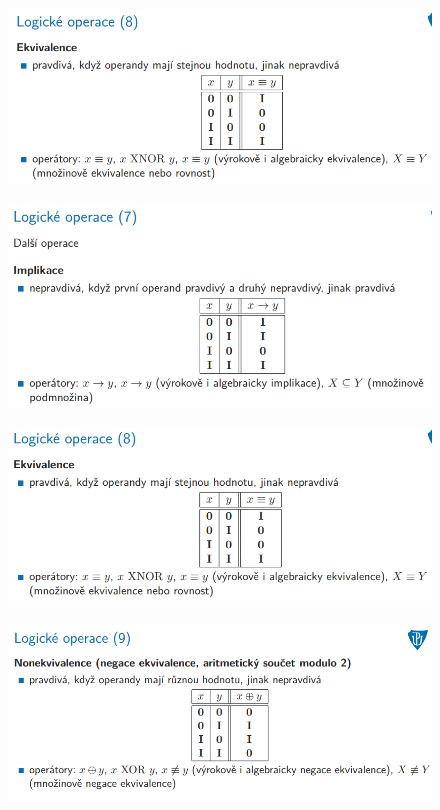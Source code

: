 \documentclass[10pt,a4paper]{article}
\begin{document}
\begin{figure} [h]
	\includegraphics[scale=0.65]{img/prvni_odstavec/otazka2/logicke_operace9.png}	
\end{figure}

\begin{figure} [h]
	\includegraphics[scale=0.65]{img/prvni_odstavec/otazka2/logicke_operace10.png}	
\end{figure}

\begin{figure} [h]
	\includegraphics[scale=0.65]{img/prvni_odstavec/otazka2/logicke_operace11.png}	
\end{figure}

\begin{figure} [h]
	\includegraphics[scale=0.65]{img/prvni_odstavec/otazka2/logicke_operace12.png}	
\end{figure}
\end{document}

